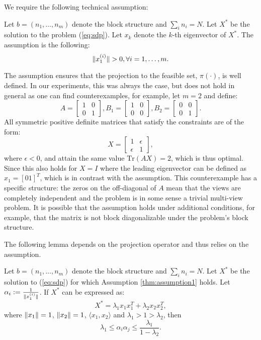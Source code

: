 We require the following technical assumption:
\begin{assumption}\label{thm:assumption1}
Let $b = \left(n_1,\ldots,n_m\right)$ denote the block structure and $ \sum_i n_i = N $.
Let $X^*$ be the solution to the problem (\ref{eq:sdp}). Let $x_k$ denote the $k$-th
eigenvector of $X^*$. The assumption is the following:
$$\lVert x_1^{(i)}\rVert > 0, \forall i = 1,\ldots, m.$$
\end{assumption}

\begin{remark} The assumption ensures that the projection to the feasible set,
$\pi(\cdot)$, is well defined. In our experiments, this was always
the case, but does not hold in general as one can find counterexamples, for example, let $m = 2$ and define:
$$
A = \begin{bmatrix}
  1 & 0 \\
  0 & 1
 \end{bmatrix},
B_1 = \begin{bmatrix}
  1 & 0 \\
  0 & 0
 \end{bmatrix},
B_2 = \begin{bmatrix}
  0 & 0 \\
  0 & 1
 \end{bmatrix}.
$$
All symmetric positive definite matrices that satisfy the constraints are of the form:
$$
X = \begin{bmatrix}
  1 & \epsilon \\
  \epsilon & 1
  \end{bmatrix},
$$ where $\epsilon < 0$, and attain the same value $\mathrm{Tr}\left(A X \right) = 2$, which is thus optimal.
Since this also holds for $X = I$ where the leading eigenvector can be defined as $x_1 = [0 1]^T$, which is in
contrast with the assumption. This counterexample has a specific structure: the zeros on the off-diagonal of $A$
mean that the views are completely independent and the problem is in some sense a trivial multi-view problem.
It is possible that the assumption holds under additional conditions, for example, that the
matrix is not block diagonalizable under the problem's block structure.

\end{remark}


The following lemma depends on the projection
operator and thus relies on the assumption.

\begin{lemma}
Let $b = \left(n_1,\ldots,n_m\right)$ denote the block structure and $ \sum_i n_i = N $.
Let $X^*$ be the solution to (\ref{eq:sdp}) for which Assumption \ref{thm:assumption1} holds.
Let $\alpha_i := \frac{1}{\lVert x_1^{(i)}\rVert}$.
If $X^*$ can be expressed as:
$$X^* = \lambda_1  x_1 x_1^T + \lambda_2 x_2 x_2^T,$$
where $\lVert x_1\rVert=1$, $\lVert x_2\rVert=1$, $\langle x_1, x_2 \rangle$ and $\lambda_1 > 1 >  \lambda_2$, then
$$\lambda_1 \leq \alpha_i \alpha_j  \leq \frac{\lambda_1}{1 - \lambda_2}.$$
\end{lemma}

